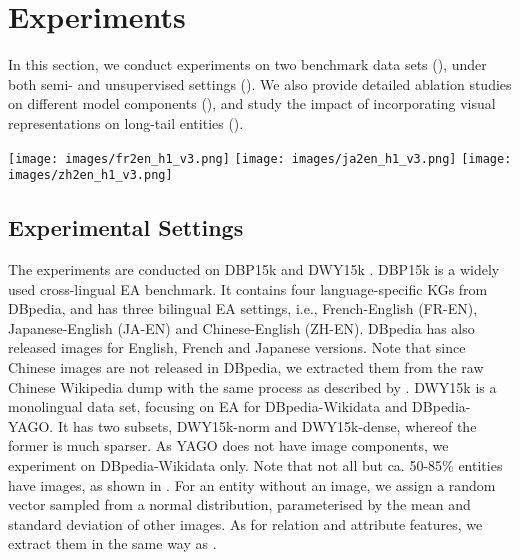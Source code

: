 \documentclass[letterpaper]{article} \usepackage{aaai21}  \usepackage{times}  \usepackage{helvet} \usepackage{courier}  \usepackage[hyphens]{url}  \usepackage{graphicx} \urlstyle{rm} \def\UrlFont{\rm}  \usepackage{natbib}  \usepackage{caption} \frenchspacing  \setlength{\pdfpagewidth}{8.5in}  \setlength{\pdfpageheight}{11in}
\newcommand{\modelname}[0]{\textbf{\textsc{EVA}}\xspace}
\newcommand{\stitle}[1]{\vspace{0.3ex} \noindent{\bf #1}}
\begin{document}
\section{Experiments}
\label{sec:exp}



In this section, we conduct experiments on two benchmark data sets (), under both semi- and unsupervised settings ().
We also provide detailed ablation studies on different model components (),
and study the impact of incorporating visual representations on long-tail entities ().  



\begin{figure*}[!t]
    \centering
    \texttt{[image: images/fr2en\_h1\_v3.png]}
    \texttt{[image: images/ja2en\_h1\_v3.png]}
    \texttt{[image: images/zh2en\_h1\_v3.png]}
\caption{\small{Unsupervised \modelname vs. semi-supervised \modelname. Plotting H@1 against number of induced visual seeds for jump-starting the training.}}
    \label{fig:unsup}
\end{figure*}

\subsection{Experimental Settings}
\label{sec:exp_setting}
\stitle{Data sets.} 
The experiments are conducted on DBP15k \citep{sun2017cross} and DWY15k \citep{guo2019learning}. DBP15k is a widely used cross-lingual EA benchmark. It contains four language-specific KGs from DBpedia, and has three bilingual EA settings, i.e., French-English (FR-EN), Japanese-English (JA-EN) and Chinese-English (ZH-EN). 
DBpedia has also released images for English, French and Japanese versions. Note that since Chinese images are not released in DBpedia,
we extracted them from the raw Chinese Wikipedia dump with the same process as described by \citet{lehmann2015dbpedia}. DWY15k is a monolingual data set, focusing on EA for DBpedia-Wikidata and DBpedia-YAGO. It has two subsets, DWY15k-norm and DWY15k-dense, whereof the former is much sparser. As YAGO does not have image components, we experiment on DBpedia-Wikidata only. Note that not all but ca. 50-85\% entities have images, as shown in . For an entity without an image, we assign a random vector sampled from a normal distribution, parameterised by the mean and standard deviation of other images. 
As for relation and attribute features, we extract them in the same way as \citet{yang2019aligning}.
\end{document}

